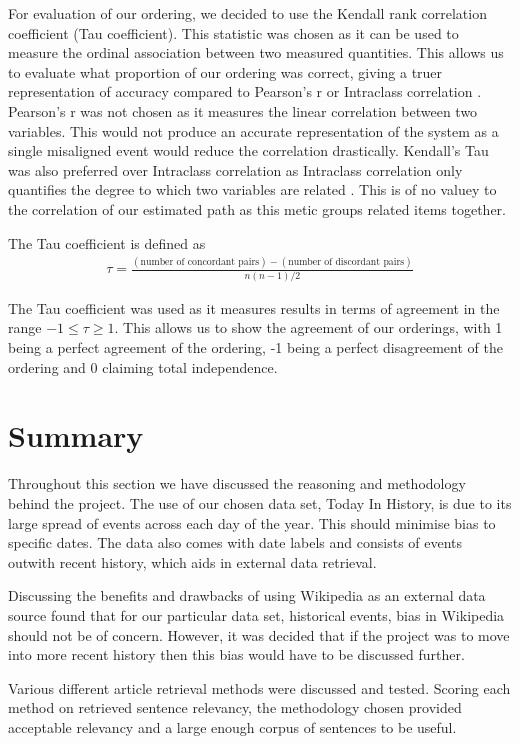 \documentclass[bsc,frontabs,twoside,singlespacing,parskip,deptreport]{infthesis}     %
\begin{document}
For evaluation of our ordering, we decided to use the Kendall rank correlation coefficient (Tau coefficient).
This statistic was chosen as it can be used to measure the ordinal association between two measured quantities.
This allows us to evaluate what proportion of our ordering was correct, giving a truer representation of accuracy
compared to Pearson's r or Intraclass correlation \cite{}.
Pearson's r was not chosen as it measures the linear correlation between two variables\cite{}.
This would not produce an accurate representation of the system as a single misaligned event would reduce the
correlation drastically.
Kendall's Tau was also preferred over Intraclass correlation as Intraclass correlation only quantifies the
degree to which two variables are related \cite{}. This is of no valuey to the correlation of our estimated path
as this metic groups related items together.


The Tau coefficient is defined as
\begin{eqnarray}
  \tau=\frac{(\text{number of concordant pairs})-(\text{number of discordant pairs})}{n(n-1)/2}\nonumber
\end{eqnarray}\cite{abdi2007kendall}

The Tau coefficient was used as it measures results in terms of agreement in the range $-1 \leq \tau \geq 1$.
This allows us to show the agreement of our orderings, with 1 being a perfect agreement of the ordering, -1 being a perfect disagreement of the ordering and 0 claiming
total independence.


\section{Summary}
Throughout this section we have discussed the reasoning and methodology behind the project.
The use of our chosen data set, Today In History, is due to its large spread of events across
each day of the year. This should minimise bias to specific dates. The data also comes with date labels and
consists of events outwith recent history, which aids in external data retrieval.

Discussing the benefits and drawbacks of using Wikipedia as an external data source found that
for our particular data set, historical events, bias in Wikipedia should not be of concern.
However, it was decided that if the project was to move into more recent history then this bias would
have to be discussed further.

Various different article retrieval methods were discussed and tested.
Scoring each method on retrieved sentence relevancy, the methodology chosen provided acceptable relevancy
and a large enough corpus of sentences to be useful.
\end{document}
